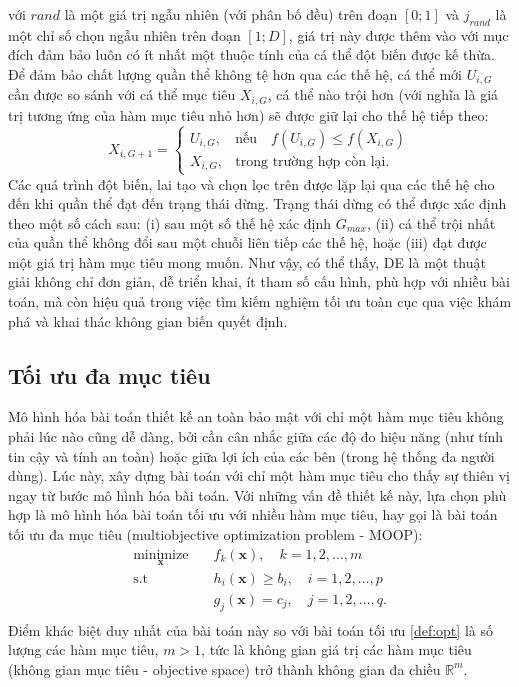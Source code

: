 \documentclass[../main.tex]{subfiles}
\begin{document}
với $rand$ là một giá trị ngẫu nhiên (với phân bố đều) trên đoạn $\left[0;1\right]$ và $j_{rand}$ là một chỉ số chọn ngẫu nhiên trên đoạn $\left[1;D\right]$, giá trị này được thêm vào với mục đích đảm bảo luôn có ít nhất một thuộc tính của cá thể đột biến được kế thừa. Để đảm bảo chất lượng quần thể không tệ hơn qua các thế hệ, cá thể mới $U_{i,G}$ cần được so sánh với cá thể mục tiêu $X_{i,G}$, cá thể nào trội hơn (với nghĩa là giá trị tương ứng của hàm mục tiêu nhỏ hơn) sẽ được giữ lại cho thế hệ tiếp theo:
\begin{equation}
X_{i,G+1} = 
\begin{cases}
    U_{i,G},& \text{nếu} \quad f(U_{i,G}) \leq f(X_{i,G}) \\
    X_{i,G},& \text{trong trường hợp còn lại}.
\end{cases}
\end{equation}
Các quá trình đột biến, lai tạo và chọn lọc trên được lặp lại qua các thế hệ cho đến khi quần thể đạt đến trạng thái dừng. Trạng thái dừng có thể được xác định theo một số cách sau: (i) sau một số thế hệ xác định $G_{max}$, (ii) cá thể trội nhất của quần thể không đổi sau một chuỗi liên tiếp các thế hệ, hoặc (iii) đạt được một giá trị hàm mục tiêu mong muốn. Như vậy, có thể thấy, DE là một thuật giải không chỉ đơn giản, dễ triển khai, ít tham số cấu hình, phù hợp với nhiều bài toán, mà còn hiệu quả trong việc tìm kiếm nghiệm tối ưu toàn cục qua việc khám phá và khai thác không gian biến quyết định.

\subsection{Tối ưu đa mục tiêu}

Mô hình hóa bài toán thiết kế an toàn bảo mật với chỉ một hàm mục tiêu không phải lúc nào cũng dễ dàng, bởi cần cân nhắc giữa các độ đo hiệu năng (như tính tin cậy và tính an toàn) hoặc giữa lợi ích của các bên (trong hệ thống đa người dùng). Lúc này, xây dựng bài toán với chỉ một hàm mục tiêu cho thấy sự thiên vị ngay từ bước mô hình hóa bài toán. Với những vấn đề thiết kế này, lựa chọn phù hợp là mô hình hóa bài toán tối ưu với nhiều hàm mục tiêu, hay gọi là bài toán tối ưu đa mục tiêu (multiobjective optimization problem - MOOP):
\begin{equation}\label{def:moop}
\begin{aligned}
\underset{\mathbf{x}}{\text{minimize}} \quad & f_k\left(\mathbf{x}\right), \quad k=1,2,\dots,m \\
\textrm{s.t} \quad & h_i\left(\mathbf{x}\right) \geq b_i, \quad i=1,2,\dots,p \\
\quad & g_j\left(\mathbf{x}\right) = c_j, \quad j=1,2,\dots,q.\\
\end{aligned}
\end{equation}
Điểm khác biệt duy nhất của bài toán này so với bài toán tối ưu \eqref{def:opt} là số lượng các hàm mục tiêu, $m > 1$, tức là không gian giá trị các hàm mục tiêu (không gian mục tiêu - objective space) trở thành không gian đa chiều $\mathbb{R}^m$.
\end{document}
